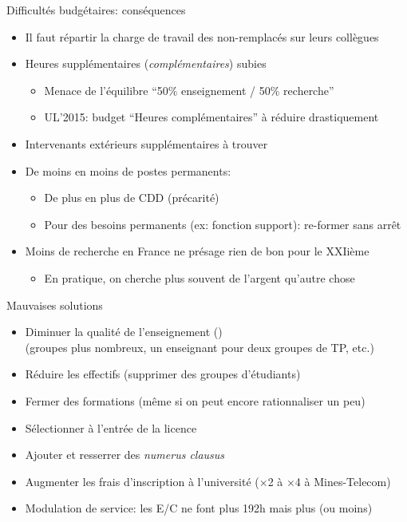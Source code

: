 \documentclass[10pt,final,usepdftitle=false]{beamer}
\begin{document}
\begin{frame}{Difficultés budgétaires: conséquences}
\begin{itemize}
\item Il faut répartir la charge de travail des non-remplacés sur leurs collègues
\item Heures supplémentaires (\textsl{complémentaires}) subies
  \begin{itemize}
  \item Menace de l'équilibre ``50\% enseignement / 50\% recherche''
  \item UL'2015: budget ``Heures complémentaires'' à réduire drastiquement
  \end{itemize}
\item Intervenants extérieurs supplémentaires à trouver%
\item De moins en moins de postes permanents:
\begin{itemize}
\item De plus en plus de CDD (précarité)
\item Pour des besoins permanents (ex: fonction support): re-former sans arrêt
\end{itemize}
\medskip
\item Moins de recherche en France ne présage rien de bon pour le XXIième
  \begin{itemize}
  \item En pratique, on cherche plus souvent de l'argent qu'autre chose
  \end{itemize}
\end{itemize}
\end{frame}

\begin{frame}{Mauvaises solutions}
\begin{itemize}
\item Diminuer la qualité de l'enseignement ()\\
  {\small (groupes plus nombreux, un enseignant pour deux groupes de TP, etc.)}
\item Réduire les effectifs (supprimer des groupes d'étudiants)
\item Fermer des formations (même si on peut encore rationnaliser un peu)
\item Sélectionner à l'entrée de la licence
\item Ajouter et resserrer des \textsl{numerus clausus}
\item Augmenter les frais d'inscription à l'université %
  ($\times$2 à $\times$4 à Mines-Telecom)
\item Modulation de service: les E/C ne font plus 192h mais plus (ou moins)
\end{itemize}
\end{frame}
\end{document}
